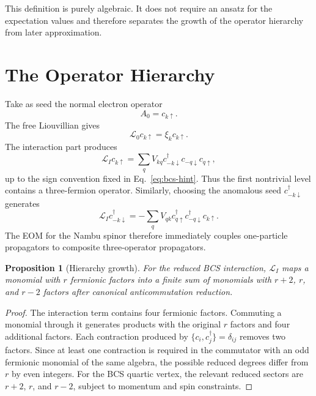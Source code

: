 \documentclass[aps,prb,reprint,superscriptaddress,nofootinbib]{revtex4-2}
\newtheorem{proposition}{Proposition}
\newcommand{\Liouv}{\mathcal{L}}
\begin{document}
This definition is purely algebraic. It does not require an ansatz for the expectation values and therefore separates the growth of the operator hierarchy from later approximation.

\section{The Operator Hierarchy}

Take as seed the normal electron operator
\begin{equation}
A_0=c_{k\uparrow}.
\end{equation}
The free Liouvillian gives
\begin{equation}
\Liouv_0 c_{k\uparrow}=\xi_k c_{k\uparrow}.
\end{equation}
The interaction part produces
\begin{equation}
\Liouv_I c_{k\uparrow}
= \sum_q V_{kq} c^\dagger_{-k\downarrow}
c_{-q\downarrow}c_{q\uparrow},
\label{eq:first-level}
\end{equation}
up to the sign convention fixed in Eq.~\eqref{eq:bcs-hint}. Thus the first nontrivial level contains a three-fermion operator. Similarly, choosing the anomalous seed \(c^\dagger_{-k\downarrow}\) generates
\begin{equation}
\Liouv_I c^\dagger_{-k\downarrow}
= -\sum_q V_{qk} c^\dagger_{q\uparrow}
c^\dagger_{-q\downarrow}c_{k\uparrow}.
\end{equation}
The EOM for the Nambu spinor therefore immediately couples one-particle propagators to composite three-operator propagators.

\begin{proposition}[Hierarchy growth]
For the reduced BCS interaction, \(\Liouv_I\) maps a monomial with \(r\) fermionic factors into a finite sum of monomials with \(r+2\), \(r\), and \(r-2\) factors after canonical anticommutation reduction.
\end{proposition}

\begin{proof}
The interaction term contains four fermionic factors. Commuting a monomial through it generates products with the original \(r\) factors and four additional factors. Each contraction produced by \(\{c_i,c^\dagger_j\}=\delta_{ij}\) removes two factors. Since at least one contraction is required in the commutator with an odd fermionic monomial of the same algebra, the possible reduced degrees differ from \(r\) by even integers. For the BCS quartic vertex, the relevant reduced sectors are \(r+2\), \(r\), and \(r-2\), subject to momentum and spin constraints.
\end{proof}
\end{document}
